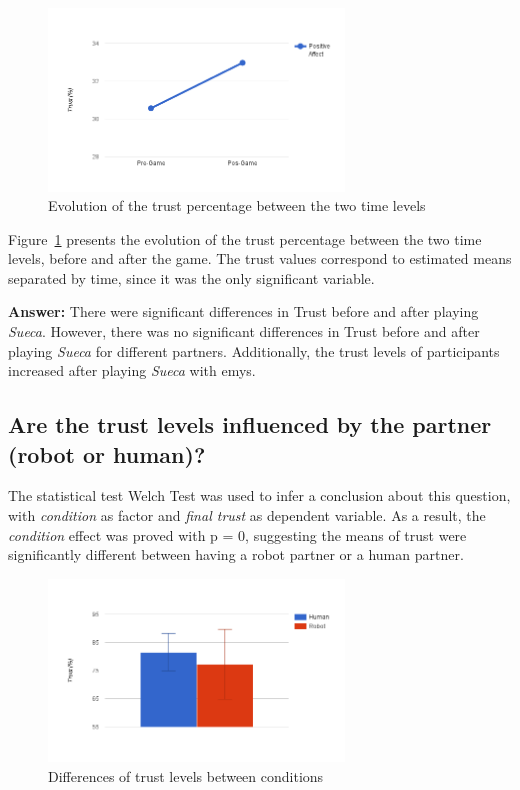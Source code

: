 \begin{figure}[h!]
  \centering
    \includegraphics[width=0.7\textwidth]{./img/7/trustTime}
  \caption{Evolution of the trust percentage between the two time levels}
\label{fig:trustTime}
\end{figure}

Figure~\ref{fig:trustTime} presents the evolution of the trust percentage between the two time levels, before and after the game.
The trust values correspond to estimated means separated by time, since it was the only significant variable.

\textbf{Answer:} There were significant differences in Trust before and after playing \emph{Sueca}.
However, there was no significant differences in Trust before and after playing \emph{Sueca} for different partners.
Additionally, the trust levels of participants increased after playing \emph{Sueca} with \ac{emys}.



\subsection*{Are the trust levels influenced by the partner (robot or human)?}
The statistical test Welch Test was used to infer a conclusion about this question, with \emph{condition} as factor and \emph{final trust} as dependent variable.
As a result, the \emph{condition} effect was proved with p = 0, suggesting the means of trust were significantly different between having a robot partner or a human partner.

\begin{figure}[h!]
  \centering
    \includegraphics[width=0.7\textwidth]{./img/7/trustCondition}
  \caption{Differences of trust levels between conditions}
\label{fig:trustCondition}
\end{figure}

